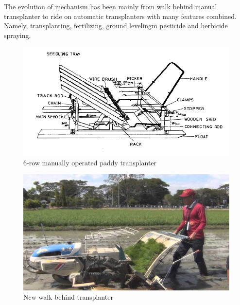 \documentclass[a4paper,latin,center,onecolumn]{paper}
\begin{document}
            The evolution of mechanism has been mainly from walk behind manual transplanter to ride on automatic transplanters with many features combined. Namely, transplanting, fertilizing, ground levelingm pesticide and herbicide spraying.

            \begin{figure}[hbt!]
                \centering
                \includegraphics[width=0.9\columnwidth]{Images/Six-row-manually-operated-paddy-transplanter.png}
                \caption{6-row manually operated paddy transplanter}
                \label{fig:manualTransplanter}
            \end{figure}

            \begin{figure}[hbt!]
                \centering
                \includegraphics[width=0.9\columnwidth]{Images/walk_behind_transplanter_new.jpg}
                \caption{New walk behind transplanter}
                \label{fig:walkBehindTransplanter}
            \end{figure}
\end{document}
